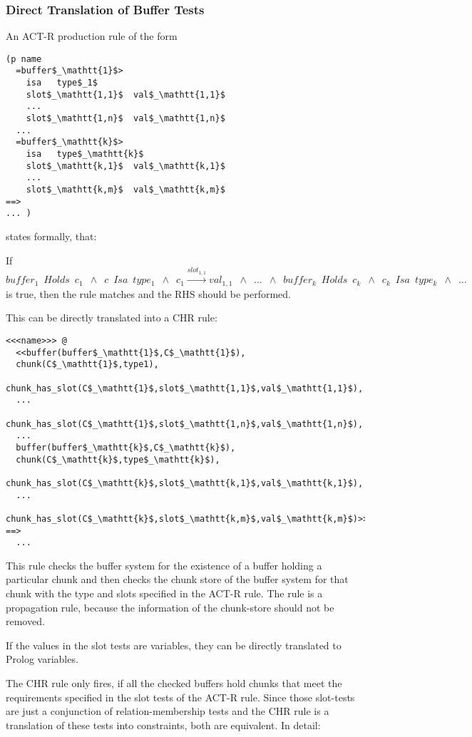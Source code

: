 \subsubsection{Direct Translation of Buffer Tests}

An ACT-R production rule of the form

\begin{lstlisting}[mathescape]
(p name
  =buffer$_\mathtt{1}$>
    isa   type$_1$
    slot$_\mathtt{1,1}$  val$_\mathtt{1,1}$
    ...
    slot$_\mathtt{1,n}$  val$_\mathtt{1,n}$
  ...
  =buffer$_\mathtt{k}$>
    isa   type$_\mathtt{k}$
    slot$_\mathtt{k,1}$  val$_\mathtt{k,1}$
    ...
    slot$_\mathtt{k,m}$  val$_\mathtt{k,m}$
==>
... )
\end{lstlisting}

states formally, that:

If $buffer_1 \enspace Holds \enspace c_1 \enspace \wedge \enspace c \enspace Isa \enspace type_1 \enspace \wedge \enspace c_1 \xrightarrow{slot_{1,1}} val_{1,1} \enspace \wedge \enspace \dots \enspace \wedge \enspace buffer_k \enspace Holds \enspace c_k \enspace \wedge \enspace c_k \enspace Isa \enspace type_k \enspace \wedge \enspace \dots$ is true, then the rule matches and the RHS should be performed.

This can be directly translated into a CHR rule:

\begin{lstlisting}[mathescape]
<<<name>>> @
  <<buffer(buffer$_\mathtt{1}$,C$_\mathtt{1}$),
  chunk(C$_\mathtt{1}$,type1),
  chunk_has_slot(C$_\mathtt{1}$,slot$_\mathtt{1,1}$,val$_\mathtt{1,1}$),
  ...
  chunk_has_slot(C$_\mathtt{1}$,slot$_\mathtt{1,n}$,val$_\mathtt{1,n}$),
  ...
  buffer(buffer$_\mathtt{k}$,C$_\mathtt{k}$),
  chunk(C$_\mathtt{k}$,type$_\mathtt{k}$),
  chunk_has_slot(C$_\mathtt{k}$,slot$_\mathtt{k,1}$,val$_\mathtt{k,1}$),
  ...
  chunk_has_slot(C$_\mathtt{k}$,slot$_\mathtt{k,m}$,val$_\mathtt{k,m}$)>>
==>
  ...
\end{lstlisting}

This rule checks the buffer system for the existence of a buffer holding a particular chunk and then checks the chunk store of the buffer system for that chunk with the type and slots specified in the ACT-R rule. The rule is a propagation rule, because the information of the chunk-store should not be removed.

If the values in the slot tests are variables, they can be directly translated to Prolog variables.

The CHR rule only fires, if all the checked buffers hold chunks that meet the requirements specified in the slot tests of the ACT-R rule. Since those slot-tests are just a conjunction of relation-membership tests and the CHR rule is a translation of these tests into constraints, both are equivalent. In detail: 

